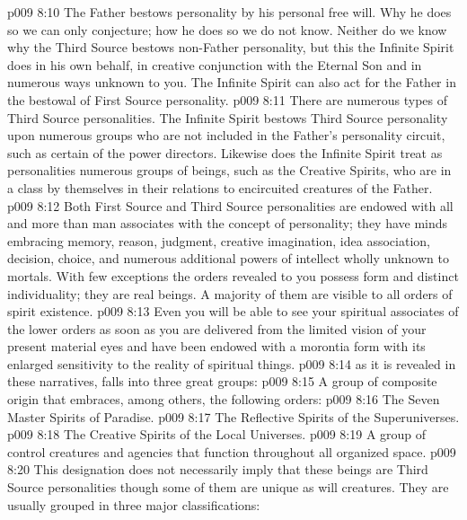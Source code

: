 \vs p009 8:10 \pc The Father bestows personality by his personal free will. Why he does so we can only conjecture; how he does so we do not know. Neither do we know why the Third Source bestows non\hyp{}Father personality, but this the Infinite Spirit does in his own behalf, in creative conjunction with the Eternal Son and in numerous ways unknown to you. The Infinite Spirit can also act for the Father in the bestowal of First Source personality.
\vs p009 8:11 \pc There are numerous types of Third Source personalities. The Infinite Spirit bestows Third Source personality upon numerous groups who are not included in the Father’s personality circuit, such as certain of the power directors. Likewise does the Infinite Spirit treat as personalities numerous groups of beings, such as the Creative Spirits, who are in a class by themselves in their relations to encircuited creatures of the Father.
\vs p009 8:12 Both First Source and Third Source personalities are endowed with all and more than man associates with the concept of personality; they have minds embracing memory, reason, judgment, creative imagination, idea association, decision, choice, and numerous additional powers of intellect wholly unknown to mortals. With few exceptions the orders revealed to you possess form and distinct individuality; they are real beings. A majority of them are visible to all orders of spirit existence.
\vs p009 8:13 Even you will be able to see your spiritual associates of the lower orders as soon as you are delivered from the limited vision of your present material eyes and have been endowed with a morontia form with its enlarged sensitivity to the reality of spiritual things.
\vs p009 8:14 \pc {} as it is revealed in these narratives, falls into three great groups:
\vs p009 8:15 \pc {}\bibnobreakspace {} A group of composite origin that embraces, among others, the following orders:
\vs p009 8:16 \bibnobreakspace The Seven Master Spirits of Paradise.
\vs p009 8:17 \bibnobreakspace The Reflective Spirits of the Superuniverses.
\vs p009 8:18 \bibnobreakspace The Creative Spirits of the Local Universes.
\vs p009 8:19 \pc {}\bibnobreakspace {} A group of control creatures and agencies that function throughout all organized space.
\vs p009 8:20 \pc {}\bibnobreakspace {} This designation does not necessarily imply that these beings are Third Source personalities though some of them are unique as will creatures. They are usually grouped in three major classifications:
